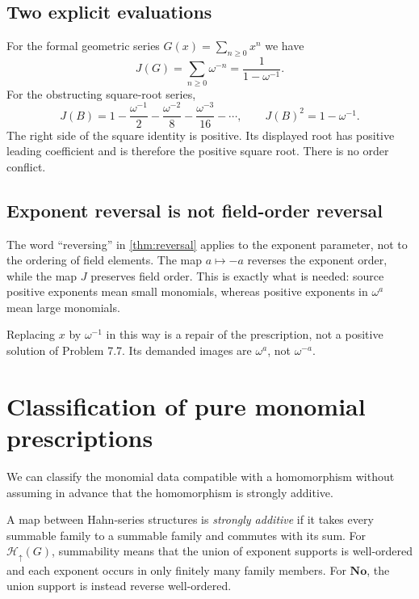 \documentclass[11pt,letterpaper]{article}
\theoremstyle{definition}
\theoremstyle{remark}
\newenvironment{definition}{\crefalias{theorem}{definition}\definitionx}{\enddefinitionx}
\newcommand{\No}{\mathbf{No}}
\newcommand{\Hu}[1]{\mathcal H_{\uparrow}(#1)}
\begin{document}
\subsection{Two explicit evaluations}
For the formal geometric series $G(x)=\sum_{n\ge0}x^n$ we have
\begin{equation}\label{eq:goodgeom}
 J(G)=\sum_{n\ge0}\omega^{-n}=\frac{1}{1-\omega^{-1}}.
\end{equation}
For the obstructing square-root series,
\begin{equation}\label{eq:goodroot}
 J(B)=1-\frac{\omega^{-1}}2-\frac{\omega^{-2}}8
       -\frac{\omega^{-3}}{16}-\cdots,
 \qquad J(B)^2=1-\omega^{-1}.
\end{equation}
The right side of the square identity is positive. Its displayed root has
positive leading coefficient and is therefore the positive square root.
There is no order conflict.

\subsection{Exponent reversal is not field-order reversal}
The word ``reversing'' in \cref{thm:reversal} applies to the exponent parameter,
not to the ordering of field elements. The map $a\mapsto-a$ reverses the
exponent order, while the map $J$ preserves field order. This is exactly what
is needed: source positive exponents mean small monomials, whereas positive
exponents in $\omega^a$ mean large monomials.

Replacing $x$ by $\omega^{-1}$ in this way is a repair of the prescription,
not a positive solution of Problem 7.7. Its demanded images are $\omega^a$,
not $\omega^{-a}$.

\section{Classification of pure monomial prescriptions}\label{sec:classification}
We can classify the monomial data compatible with a homomorphism without
assuming in advance that the homomorphism is strongly additive.

\begin{definition}
A map between Hahn-series structures is \emph{strongly additive} if it takes
every summable family to a summable family and commutes with its sum.
For $\Hu{G}$, summability means that the union of exponent supports is
well-ordered and each exponent occurs in only finitely many family members.
For $\No$, the union support is instead reverse well-ordered.
\end{definition}
\end{document}
